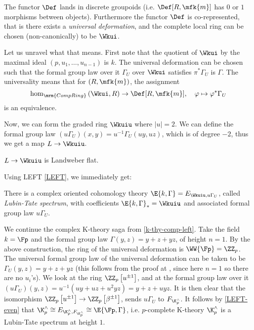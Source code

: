 \begin{theorem}
	The functor $\Def$ lands in discrete groupoids (i.e. $\Def[R, \mfk{m}]$ has $0$ or $1$ morphisms between objects).
	Furthermore the functor $\Def$ is co-represented, that is there exists a \emph{universal deformation}, and the complete local ring can be chosen (non-canonically) to be $\Wkui$.
\end{theorem}

Let us unravel what that means.
First note that the quotient of $\Wkui$ by the maximal ideal $\left(p, u_1, \dotsc, u_{n-1}\right)$ is $k$.
The universal deformation can be chosen such that the formal group law over it $\Gamma_U$ over $\Wkui$ satisfies $\pi^* \Gamma_U$ is $\Gamma$.
The universality means that for $\left(R, \mfk{m}\right)$, the assignment
$$
\hom_{\mrm{CompRing}}\left(\Wkui, R\right) \to \Def[R, \mfk{m}], \quad
\varphi \mapsto \varphi^* \Gamma_U
$$
is an equivalence.

Now, we can form the graded ring $\Wkuiu$ where $\left|u\right| = 2$.
We can define the formal group law $\left(u \Gamma_U\right) \left(x, y\right) = u^{-1} \Gamma_U \left(u y, u z\right)$, which is of degree $-2$, thus we get a map $L \to \Wkuiu$.

\begin{proposition}
	$L \to \Wkuiu$ is Landweber flat.
\end{proposition}

Using LEFT \ref{LEFT}, we immediately get:

\begin{corollary}\label{LT-spectrum}
	There is a complex oriented cohomology theory $\E{k, \Gamma} = E_{\Wkuiu, u \Gamma_U}$, called \emph{Lubin-Tate spectrum}, with coefficients $\E{k, \Gamma}_* = \Wkuiu$ and associated formal group law $u \Gamma_U$.
\end{corollary}

\begin{example}\label{k-thy-comp-defo}
	We continue the complex K-theory saga from \ref{k-thy-comp-left}.
	Take the field $k = \Fp$ and the formal group law $\Gamma\left(y, z\right) = y + z + y z$, of height $n = 1$.
	By the above construction, the ring of the universal deformation is $\WW{\Fp} = \ZZ_p$.
	The universal formal group law of the universal deformation can be taken to be $\Gamma_U \left(y, z\right) = y + z + y z$ (this follows from the proof at \cite[5.10]{Rez}, since here $n=1$ so there are no $u_i$'s).
	We look at the ring $\ZZ_p\left[u^{\pm1}\right]$, and at the formal group law over it
	$
	\left(u\Gamma_U\right) \left(y, z\right)
	= u^{-1} \left(u y + u z + u^2 y z\right)
	= y + z + u y z
	$.
	It is then clear that the isomorphism $\ZZ_p\left[u^{\pm1}\right] \to \ZZ_p\left[\beta^{\pm1}\right]$, sends $u\Gamma_U$ to $F_{\K_p^\wedge}$.
	It follows by \ref{LEFT-even} that
	$
	\K_p^\wedge
	\cong E_{\K_p^\wedge, F_{\K_p^\wedge}}
	\cong \E{\Fp, \Gamma}
	$,
	i.e. $p$-complete K-theory $\K_p^\wedge$ is a Lubin-Tate spectrum at height $1$.
\end{example}

